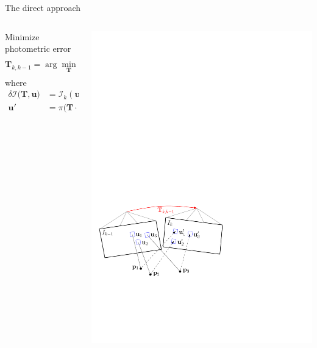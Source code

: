 \documentclass[10pt]{beamer}
\newcommand{\T}{\mathbf{T}}
\newcommand{\bu}{\mathbf{u}}
\newcommand{\I}{\mathcal{I}}
\begin{document}
\begin{frame}{The direct approach}
	\begin{columns}
	  	\begin{column}{0.5\textwidth}
	  		\begin{block}{Minimize photometric error}
			  	\[
		  			\T_{k,k-1} = \arg\min_\T \iint_{\bar{\mathcal{R}}} \rho\Big[ \delta \I\big(\T, \bu\big) \Big] d\bu.
				\]
				where
				\[ 
					\begin{aligned}
				  		\delta \I\big(\T, \bu\big) &= \I_k(\bu') - \I_{k-1}(\bu) \\
				  		\bu' &= \pi\big(\T \cdot \pi^{-1}(\bu, z_\bu)\big) 
			   		\end{aligned}
				\]
			\end{block}
		\end{column}
	    \begin{column}{0.5\textwidth}
		    \includegraphics[width=\textwidth]{img/sparse_img_alignment}

\end{column}
\end{columns}
\end{frame}
\end{document}
